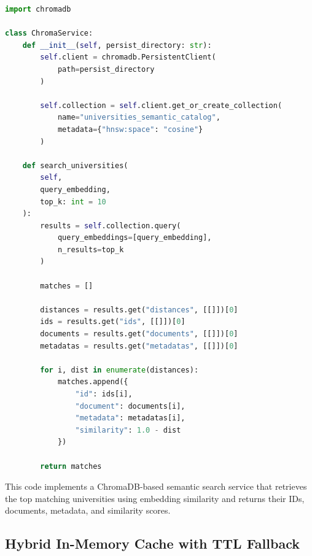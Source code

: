 \begin{lstlisting}[language=Python]
import chromadb

class ChromaService:
    def __init__(self, persist_directory: str):
        self.client = chromadb.PersistentClient(
            path=persist_directory
        )

        self.collection = self.client.get_or_create_collection(
            name="universities_semantic_catalog",
            metadata={"hnsw:space": "cosine"}
        )

    def search_universities(
        self,
        query_embedding,
        top_k: int = 10
    ):
        results = self.collection.query(
            query_embeddings=[query_embedding],
            n_results=top_k
        )

        matches = []

        distances = results.get("distances", [[]])[0]
        ids = results.get("ids", [[]])[0]
        documents = results.get("documents", [[]])[0]
        metadatas = results.get("metadatas", [[]])[0]

        for i, dist in enumerate(distances):
            matches.append({
                "id": ids[i],
                "document": documents[i],
                "metadata": metadatas[i],
                "similarity": 1.0 - dist
            })

        return matches
\end{lstlisting}

\vspace{25pt}

This code implements a ChromaDB-based semantic search service that retrieves the top matching universities using embedding similarity and returns their IDs, documents, metadata, and similarity scores.


\clearpage
\subsection{Hybrid In-Memory Cache with TTL Fallback}

